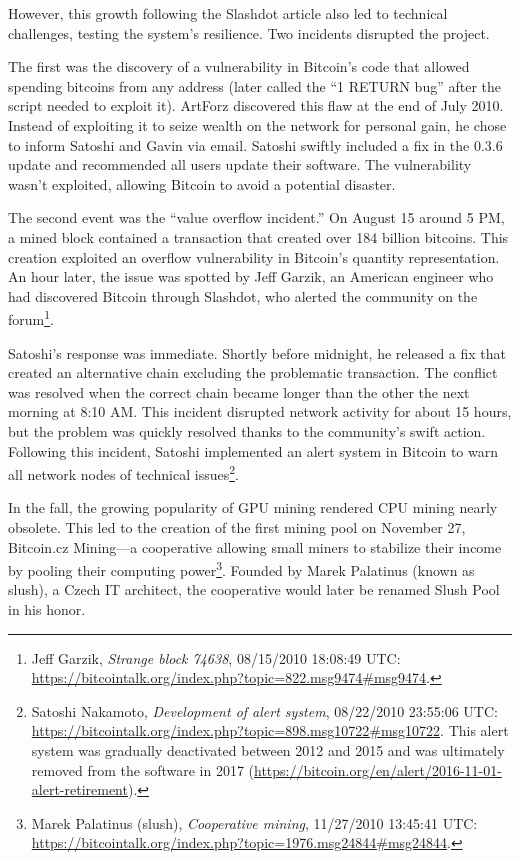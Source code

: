 \documentclass[
  a5paper,
  smalldemyvopaper,10pt,twoside,onecolumn,openright,extrafontsizes,hidelinks]{memoir}
\begin{document}
However, this growth following the Slashdot article also led to
technical challenges, testing the system's resilience. Two incidents
disrupted the project.

The first was the discovery of a vulnerability in Bitcoin's code that
allowed spending bitcoins from any address (later called the ``1 RETURN
bug'' after the script needed to exploit it). ArtForz discovered this
flaw at the end of July 2010. Instead of exploiting it to seize wealth
on the network for personal gain, he chose to inform Satoshi and Gavin
via email. Satoshi swiftly included a fix in the 0.3.6 update and
recommended all users update their software. The vulnerability wasn't
exploited, allowing Bitcoin to avoid a potential disaster.

The second event was the ``value overflow incident.'' On August 15
around 5 PM, a mined block contained a transaction that created over 184
billion bitcoins. This creation exploited an overflow vulnerability in
Bitcoin's quantity representation. An hour later, the issue was spotted
by Jeff Garzik, an American engineer who had discovered Bitcoin through
Slashdot, who alerted the community on the forum\footnote{Jeff Garzik,
  \emph{Strange block 74638}, 08/15/2010 18:08:49 UTC:
  \url{https://bitcointalk.org/index.php?topic=822.msg9474\#msg9474}.}.

Satoshi's response was immediate. Shortly before midnight, he released a
fix that created an alternative chain excluding the problematic
transaction. The conflict was resolved when the correct chain became
longer than the other the next morning at 8:10 AM. This incident
disrupted network activity for about 15 hours, but the problem was
quickly resolved thanks to the community's swift action. Following this
incident, Satoshi implemented an alert system in Bitcoin to warn all
network nodes of technical issues\footnote{Satoshi Nakamoto,
  \emph{Development of alert system}, 08/22/2010 23:55:06 UTC:
  \url{https://bitcointalk.org/index.php?topic=898.msg10722\#msg10722}.
  This alert system was gradually deactivated between 2012 and 2015 and
  was ultimately removed from the software in 2017
  (\url{https://bitcoin.org/en/alert/2016-11-01-alert-retirement}).}.

In the fall, the growing popularity of GPU mining rendered CPU mining
nearly obsolete. This led to the creation of the first mining pool on
November 27, Bitcoin.cz Mining---a cooperative allowing small miners to
stabilize their income by pooling their computing power\footnote{Marek
  Palatinus (slush), \emph{Cooperative mining}, 11/27/2010 13:45:41 UTC:
  \url{https://bitcointalk.org/index.php?topic=1976.msg24844\#msg24844}.}.
Founded by Marek Palatinus (known as slush), a Czech IT architect, the
cooperative would later be renamed Slush Pool in his honor.
\end{document}
